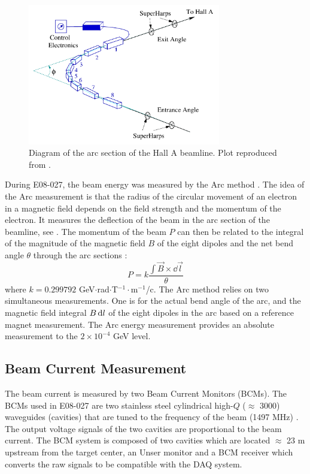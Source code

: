 \begin{figure}[b!]
  \centering
  \includegraphics[width=0.75\textwidth]{figs/arc-measurement.pdf}
  \caption[Diagram of the arc section of the beamline.]{Diagram of the arc section of the Hall A beamline. Plot reproduced from \cite{Zheng2002}.  \label{C5S2SS1F1}}
\end{figure}

During E08-027, the beam energy was measured by the Arc method \cite{Alcorn2004}. The idea of the Arc measurement is that the radius of the circular movement of an electron in a magnetic field depends on the field strength and the momentum of the electron. It measures the deflection of the beam in the arc section of the beamline, see . The momentum of the beam $P$ can then be related to the integral of the magnitude of the magnetic field $B$ of the eight dipoles and the net bend angle $\theta$ through the arc sections \cite{BEAMENERGYARC}:
\begin{equation} \label{C5S2SS1E1}
P = k \frac{\int\vec{B}\times\dd{\vec{l}}}{\theta}
\end{equation}
where $k=0.299792$ GeV$\cdot$rad$\cdot$T${}^{−1}\cdot$m${}^{−1}$/c. The Arc method relies on two simultaneous measurements. One is for the actual bend angle of the arc, and the magnetic field integral $B\dd{l}$ of the eight dipoles in the arc based on a reference magnet measurement. The Arc energy measurement provides an absolute measurement to the $2\times10^{-4}$ GeV level.

\subsection{Beam Current Measurement}
\label{C5S2SS2}

The beam current is measured by two Beam Current Monitors (BCMs). The BCMs used in E08-027 are two stainless steel cylindrical high-$Q$ ($\approx$ 3000) waveguides (cavities) that are tuned to the frequency of the beam (1497 MHz) \cite{Alcorn2004}. The output voltage signals of the two cavities are proportional to the beam current. The BCM system is composed of two cavities which are located $\approx$ 23 m upstream from the target center, an Unser monitor and a BCM receiver which converts the raw signals to be compatible with the DAQ system.

